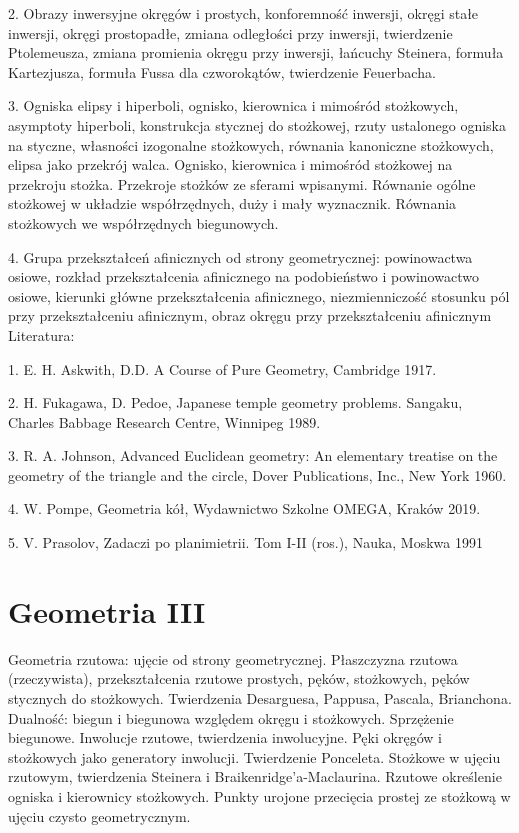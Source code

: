 \documentclass{parchment}
\begin{document}
2. Obrazy inwersyjne okręgów i prostych, konforemność inwersji, okręgi stałe inwersji, okręgi prostopadłe, zmiana odległości przy inwersji, twierdzenie Ptolemeusza, zmiana promienia okręgu przy inwersji, łańcuchy Steinera, formuła Kartezjusza, formuła Fussa dla czworokątów, twierdzenie Feuerbacha.

3. Ogniska elipsy i hiperboli, ognisko, kierownica i mimośród stożkowych, asymptoty hiperboli, konstrukcja stycznej do stożkowej, rzuty ustalonego ogniska na styczne, własności izogonalne stożkowych, równania kanoniczne stożkowych, elipsa jako przekrój walca. Ognisko, kierownica i mimośród stożkowej na przekroju stożka. Przekroje stożków ze sferami wpisanymi. Równanie ogólne stożkowej w układzie współrzędnych, duży i mały wyznacznik. Równania stożkowych we współrzędnych biegunowych.

4. Grupa przekształceń afinicznych od strony geometrycznej: powinowactwa osiowe, rozkład przekształcenia afinicznego na podobieństwo i powinowactwo osiowe, kierunki główne przekształcenia afinicznego, niezmienniczość stosunku pól przy przekształceniu afinicznym, obraz okręgu przy przekształceniu afinicznym
Literatura: 	

1. E. H. Askwith, D.D. A Course of Pure Geometry, Cambridge 1917.

2. H. Fukagawa, D. Pedoe, Japanese temple geometry problems. Sangaku, Charles Babbage Research Centre, Winnipeg 1989.

3. R. A. Johnson, Advanced Euclidean geometry: An elementary treatise on the geometry of the triangle and the circle, Dover Publications, Inc., New York 1960.

4. W. Pompe, Geometria kół, Wydawnictwo Szkolne OMEGA, Kraków 2019.

5. V. Prasolov, Zadaczi po planimietrii. Tom I-II (ros.), Nauka, Moskwa 1991

\section{Geometria III}
Geometria rzutowa: ujęcie od strony geometrycznej. Płaszczyzna rzutowa (rzeczywista), przekształcenia rzutowe prostych, pęków, stożkowych, pęków stycznych do stożkowych. Twierdzenia Desarguesa, Pappusa, Pascala, Brianchona. Dualność: biegun i biegunowa względem okręgu i stożkowych. Sprzężenie biegunowe. Inwolucje rzutowe, twierdzenia inwolucyjne. Pęki okręgów i stożkowych jako generatory inwolucji. Twierdzenie Ponceleta. Stożkowe w ujęciu rzutowym, twierdzenia Steinera i Braikenridge'a-Maclaurina. Rzutowe określenie ogniska i kierownicy stożkowych. Punkty urojone przecięcia prostej ze stożkową w ujęciu czysto geometrycznym.
\end{document}
